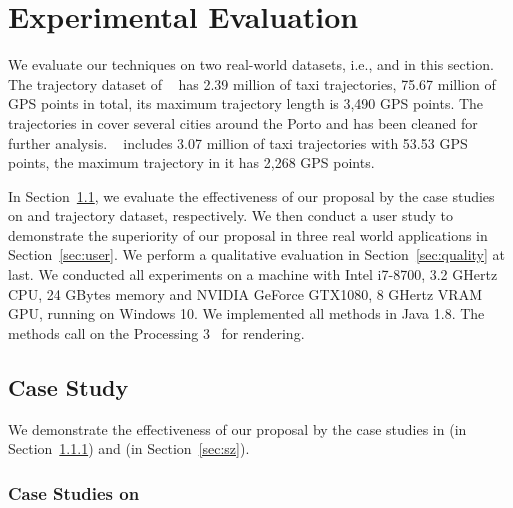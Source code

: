 \section{Experimental Evaluation}\label{sec:exp}
We evaluate our techniques on two real-world datasets, i.e., \pt{} and \sz{} in this section.
The trajectory dataset of \pt{}~\cite{pt} has 2.39 million of taxi trajectories, 75.67 million of GPS points in total, its maximum trajectory length is 3,490 GPS points.
The trajectories in \pt{} cover several cities around the Porto and has been cleaned for further analysis.
\sz{}~\cite{sz} includes 3.07 million of taxi trajectories with 53.53 GPS points, the maximum trajectory in it has 2,268 GPS points.

In Section~\ref{sec:case}, we evaluate the effectiveness of our proposal by the case studies on \pt{} and \sz{} trajectory dataset, respectively.
We then conduct a user study to demonstrate the superiority of our proposal in three real world applications in Section~\ref{sec:user}.
We perform a qualitative evaluation in Section~\ref{sec:quality} at last.
We conducted all experiments on a machine with Intel i7-8700, 3.2 GHertz CPU, 24 GBytes memory and NVIDIA GeForce GTX1080, 8 GHertz VRAM GPU, running on Windows 10.
We implemented all methods in Java 1.8. The methods call on the Processing 3~\cite{p3} for rendering.


\subsection{Case Study}\label{sec:case}

We demonstrate the effectiveness of our proposal by the case studies in \pt{} (in Section~\ref{sec:pt}) and \sz{} ({in Section~\ref{sec:sz}}).

\subsubsection{Case Studies on \pt{}}\label{sec:pt}

